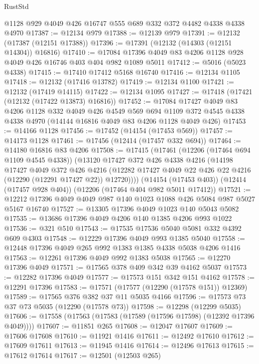 \begin{lexlean}{RustStd}
\begin{coremodule}
    @1128
    @929
    @4049
    @426
    @16747
    @555
    @689
    @332
    @372
    @4482
    @4338
    @4338
    @4970
@17387 := @12134 @979
@17388 := @12139 @979
@17391 := @12132 (@17387 (@12151 @17388))
@17396 := @17391 (@12132 (@14303 (@12151 @14304)) @16816)
@17410 := @17084 @17396 @4049 @83 @4206 @1128 @928 @4049 @426 @16746 @403 @404 @982 @1089 @5011
@17412 := @5016 (@5023 @4338)
@17415 := @17410 @17412 @5168 @16740
@17416 := @12134 @1105
@17418 := @12132 (@17416 @13782)
@17419 := @12134 @1100
@17421 := @12132 (@17419 @14115)
@17422 := @12134 @1095
@17427 := @17418 (@17421 (@12132 (@17422 @13873) @16816))
@17452 := @17084
    @17427
    @4049
    @83
    @4206
    @1128
    @332
    @4049
    @426
    @4549
    @569
    @694
    @1109
    @372
    @4545
    @4338
    @4338
    @4970
    (@14144 @16816 @4049 @83 @4206 @1128 @4049 @426)
@17453 := @14166 @1128
@17456 := @17452 (@14154 (@17453 @569))
@17457 := @14173 @1128
@17461 := @17456 (@12414 (@17457 @332 @694))
@17464 := @14180 @16816 @83 @4206
@17508 := @17415
    (@17461
      (@12206 (@17464 @694 @1109 @4545 @4338))
      (@13120
        @17427
        @372
        @426
        @4338
        @4216
        (@14198
          @17427
          @4049
          @372
          @426
          @4216
          (@12282 @17427 @4049 @22 @426 @22 @4216 (@12290 (@12291 @17427 @22)) @12720))))
    (@14154 (@17453 @403))
    (@12414 (@17457 @928 @404))
    (@12206 (@17464 @404 @982 @5011 @17412))
@17521 := @12212 @17396 @4049 @4049 @987 @140 @1023 @1088 @426 @5084 @987 @5027 @5167 @16740
@17527 := @13305 @17396 @4049 @1023 @140 @5043 @5082
@17535 := @13686 @17396 @4049 @4206 @140 @1385 @4206 @993 @1022
@17536 := @321 @510
@17543 := @17535 @17536 @5040 @5081 @332 @4392 @609 @4303
@17548 := @12229 @17396 @4049 @993 @1385 @5040
@17558 := @12448 @17396 @4049 @265 @992 @1383 @1385 @4338 @5038 @4206 @1416
@17563 := @12261 @17396 @4049 @992 @1383 @5038
@17565 := @12270 @17396 @4049
@17571 := @17565 @378 @409 @342 @39 @4162 @5037
@17573 := @12282 @17396 @4049
@17577 := @17573 @151 @342 @151 @4162
@17578 := @12291 @17396
@17583 := @17571 (@17577 (@12290 (@17578 @151)) @12369)
@17589 := @17565 @376 @382 @37 @11 @5035 @4166
@17596 := @17573 @73 @37 @73 @5035 (@12290 (@17578 @73))
@17598 := @12298 (@12299 @5035)
@17606 := @17558 (@17563 (@17583 (@17589 (@17596 @17598) (@12392 @17396 @4049))))
@17607 := @11851 @265
@17608 := @12047 @17607
@17609 := @17606 @17608
@17610 := @11921 @1416
@17611 := @12492 @17610
@17612 := @17609 @17611
@17613 := @11945 @1416
@17614 := @12496 @17613
@17615 := @17612 @17614
@17617 := @12501 (@12503 @265)

\end{coremodule}
\end{lexlean}
